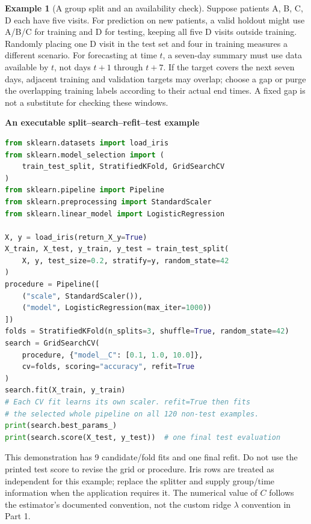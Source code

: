\documentclass[11pt,twoside]{article}
\numberwithin{equation}{section}
\theoremstyle{plain}
\theoremstyle{definition}
\newtheorem{example}[theorem]{Example}
\theoremstyle{remark}
\begin{document}
\begin{example}[A group split and an availability check]
Suppose patients A, B, C, D each have five visits. For prediction on new patients, a valid holdout might use A/B/C for training and D for testing, keeping all five D visits outside training. Randomly placing one D visit in the test set and four in training measures a different scenario. For forecasting at time $t$, a seven-day summary must use data available by $t$, not days $t+1$ through $t+7$. If the target covers the next seven days, adjacent training and validation targets may overlap; choose a gap or purge the overlapping training labels according to their actual end times. A fixed gap is not a substitute for checking these windows.
\end{example}

\begin{implementationbox}
\textbf{An executable split--search--refit--test example}
\begin{lstlisting}[language=Python,showstringspaces=false]
from sklearn.datasets import load_iris
from sklearn.model_selection import (
    train_test_split, StratifiedKFold, GridSearchCV
)
from sklearn.pipeline import Pipeline
from sklearn.preprocessing import StandardScaler
from sklearn.linear_model import LogisticRegression

X, y = load_iris(return_X_y=True)
X_train, X_test, y_train, y_test = train_test_split(
    X, y, test_size=0.2, stratify=y, random_state=42
)
procedure = Pipeline([
    ("scale", StandardScaler()),
    ("model", LogisticRegression(max_iter=1000))
])
folds = StratifiedKFold(n_splits=3, shuffle=True, random_state=42)
search = GridSearchCV(
    procedure, {"model__C": [0.1, 1.0, 10.0]},
    cv=folds, scoring="accuracy", refit=True
)
search.fit(X_train, y_train)
# Each CV fit learns its own scaler. refit=True then fits
# the selected whole pipeline on all 120 non-test examples.
print(search.best_params_)
print(search.score(X_test, y_test))  # one final test evaluation
\end{lstlisting}
This demonstration has 9 candidate/fold fits and one final refit. Do not use the printed test score to revise the grid or procedure. Iris rows are treated as independent for this example; replace the splitter and supply group/time information when the application requires it. The numerical value of $C$ follows the estimator's documented convention, not the custom ridge $\lambda$ convention in Part 1.
\end{implementationbox}
\end{document}
